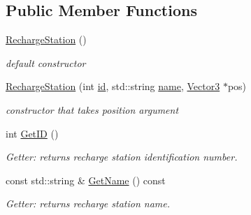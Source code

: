 \subsection*{Public Member Functions}
\begin{DoxyCompactItemize}
\item 
\mbox{\label{classRechargeStation_a2e5f2604cca1d47994be5572b6d6c439}} 
\hyperlink{classRechargeStation_a2e5f2604cca1d47994be5572b6d6c439}{Recharge\+Station} ()
\begin{DoxyCompactList}\small\item\em default constructor \end{DoxyCompactList}\item 
\mbox{\label{classRechargeStation_a97ec6d826842baa7a5cc759f49cf6ca9}} 
\hyperlink{classRechargeStation_a97ec6d826842baa7a5cc759f49cf6ca9}{Recharge\+Station} (int \hyperlink{classRechargeStation_a9caf990cd46c4b31d3258a76799f1f58}{id}, std\+::string \hyperlink{classRechargeStation_a4371be4616b798f2bdb5f8974dd5f53c}{name}, \hyperlink{classVector3}{Vector3} $\ast$pos)
\begin{DoxyCompactList}\small\item\em constructor that takes position argument \end{DoxyCompactList}\item 
\mbox{\label{classRechargeStation_a64b944545996c3006ffff5180ab4f25b}} 
int \hyperlink{classRechargeStation_a64b944545996c3006ffff5180ab4f25b}{Get\+ID} ()
\begin{DoxyCompactList}\small\item\em Getter\+: returns recharge station identification number. \end{DoxyCompactList}\item 
\mbox{\label{classRechargeStation_abc138deadf30eb8f18fa1eaaa35c28fb}} 
const std\+::string \& \hyperlink{classRechargeStation_abc138deadf30eb8f18fa1eaaa35c28fb}{Get\+Name} () const
\begin{DoxyCompactList}\small\item\em Getter\+: returns recharge station name. \end{DoxyCompactList}\item 
\mbox{\label{classRechargeStation_a9279c23b6e63f23ea2d6e27361f0c909}} 

\end{DoxyCompactItemize}
